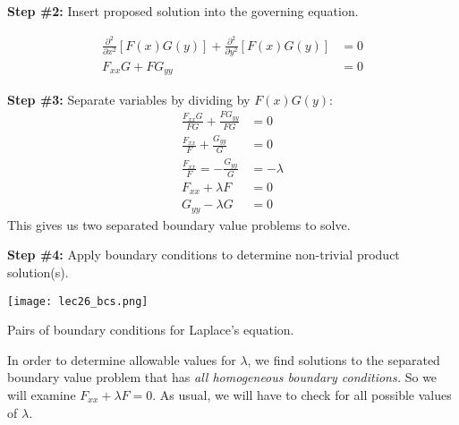\vspace{0.25cm}

\noindent\textbf{Step \#2:} Insert proposed solution into the governing equation.

\begin{align*}
\frac{\partial^2}{\partial x^2}\left[F(x)G(y)\right] + \frac{\partial^2}{\partial y^2}\left[F(x)G(y)\right] &= 0 \\
F_{xx}G + FG_{yy} &= 0
\end{align*}

\vspace{4.5cm}

\noindent\textbf{Step \#3:} Separate variables by dividing by $F(x)G(y)$:
\begin{align*}
\frac{F_{xx}G}{FG} + \frac{FG_{yy}}{FG} &= 0 \\
\frac{F_{xx}}{F} + \frac{G_{yy}}{G} &= 0 \\
\frac{F_{xx}}{F} = -\frac{G_{yy}}{G} &= -\lambda \\
F_{xx}+\lambda F &= 0 \\
G_{yy}-\lambda G &= 0
\end{align*}
This gives us two separated boundary value problems to solve.

\vspace{0.5cm}

\noindent\textbf{Step \#4:} Apply boundary conditions to determine non-trivial product solution(s).
\begin{marginfigure}
\texttt{[image: lec26\_bcs.png]}
\caption{Pairs of boundary conditions for Laplace's equation.}
\label{fig:lec26-bcs}
\end{marginfigure}

\vspace{0.1cm}

\noindent In order to determine allowable values for $\lambda$, we find solutions to the separated boundary value problem that has \emph{all homogeneous boundary conditions.}  So we will examine $F_{xx} + \lambda F = 0$.  As usual, we will have to check for all possible values of $\lambda$.


